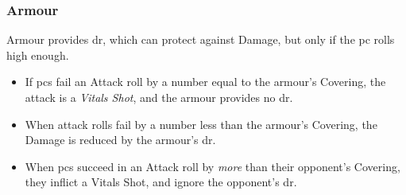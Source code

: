 \subsubsection*{Armour}

Armour provides \gls{dr}, which can protect against Damage, but only if the \gls{pc} rolls high enough.

\begin{itemize}
  \item
  If \glspl{pc} fail an Attack roll by a number equal to the armour's Covering, the attack is a \textit{Vitals Shot}, and the armour provides no \gls{dr}.
  \item
  When attack rolls fail by a number less than the armour's Covering, the Damage is reduced by the armour's \gls{dr}.
  \item
  When \glspl{pc} succeed in an Attack roll by \emph{more} than their opponent's Covering, they inflict a Vitals Shot, and ignore the opponent's \gls{dr}.
\end{itemize}

